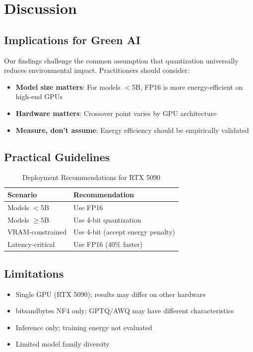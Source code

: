 \documentclass[11pt]{article}
\begin{document}
\section{Discussion}

\subsection{Implications for Green AI}

Our findings challenge the common assumption that quantization universally reduces environmental impact. Practitioners should consider:

\begin{itemize}
    \item \textbf{Model size matters}: For models $<$5B, FP16 is more energy-efficient on high-end GPUs
    \item \textbf{Hardware matters}: Crossover point varies by GPU architecture
    \item \textbf{Measure, don't assume}: Energy efficiency should be empirically validated
\end{itemize}

\subsection{Practical Guidelines}

\begin{table}[h]
\centering
\caption{Deployment Recommendations for RTX 5090}
\label{tab:guidelines}
\begin{tabular}{ll}
\toprule
\textbf{Scenario} & \textbf{Recommendation} \\
\midrule
Models $<$5B & Use FP16 \\
Models $\geq$5B & Use 4-bit quantization \\
VRAM-constrained & Use 4-bit (accept energy penalty) \\
Latency-critical & Use FP16 (40\% faster) \\
\bottomrule
\end{tabular}
\end{table}

\subsection{Limitations}

\begin{itemize}
    \item Single GPU (RTX 5090); results may differ on other hardware
    \item bitsandbytes NF4 only; GPTQ/AWQ may have different characteristics
    \item Inference only; training energy not evaluated
    \item Limited model family diversity
\end{itemize}
\end{document}
